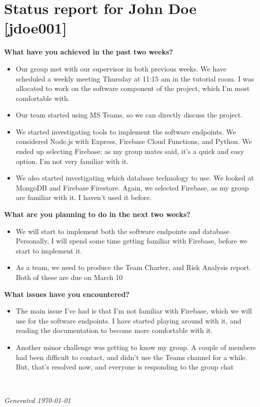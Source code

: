 \documentclass[11pt,a4paper]{article}
\newcommand{\name}{John Doe}
\newcommand{\upi}{jdoe001}
\begin{document}
\section*{Status report for \name{} [\upi]}

\textbf{What have you achieved in the past two weeks?}

\begin{itemize}
\item Our group met with our supervisor in both previous weeks. We have scheduled a weekly meeting Thursday at 11:15 am in the tutorial room. I was allocated to work on the software component of the project, which I'm most comfortable with. 

\item Our team started using MS Teams, so we can directly discuss the project.

\item We started investigating tools to implement the software endpoints. We considered Node.js with Express, Firebase Cloud Functions, and Python. We ended up selecting Firebase; as my group mates said, it's a quick and easy option. I'm not very familiar with it.

\item We also started investigating which database technology to use. We looked at MongoDB and Firebase Firestore. Again, we selected Firebase, as my group are familiar with it. I haven't used it before.
\end{itemize}

\textbf{What are you planning to do in the next two weeks?}

\begin{itemize}
\item We will start to implement both the software endpoints and database. Personally, I will spend some time getting familiar with Firebase, before we start to implement it. 

\item As a team, we need to produce the Team Charter, and Risk Analysis report. Both of these are due on March 10


\end{itemize}

\textbf{What issues have you encountered?}

\begin{itemize}

\item The main issue I've had is that I'm not familiar with Firebase, which we will use for the software endpoints. I have started playing around with it, and reading the documentation to become more comfortable with it.

\item Another minor challenge was getting to know my group. A couple of members had been difficult to contact, and didn't use the Teams channel for a while. But, that's resolved now, and everyone is responding to the group chat

\end{itemize}

~\vfill

\noindent \textit{Generated \today}
\end{document}
